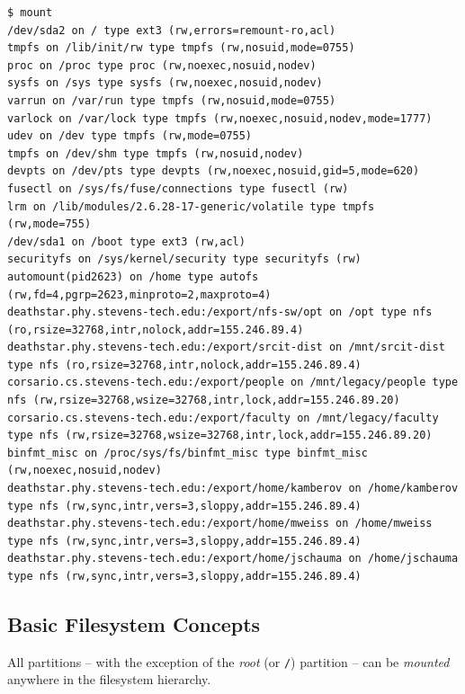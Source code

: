 \documentclass[xga]{xdvislides}
\begin{document}
\small
\begin{verbatim}
$ mount
/dev/sda2 on / type ext3 (rw,errors=remount-ro,acl)
tmpfs on /lib/init/rw type tmpfs (rw,nosuid,mode=0755)
proc on /proc type proc (rw,noexec,nosuid,nodev)
sysfs on /sys type sysfs (rw,noexec,nosuid,nodev)
varrun on /var/run type tmpfs (rw,nosuid,mode=0755)
varlock on /var/lock type tmpfs (rw,noexec,nosuid,nodev,mode=1777)
udev on /dev type tmpfs (rw,mode=0755)
tmpfs on /dev/shm type tmpfs (rw,nosuid,nodev)
devpts on /dev/pts type devpts (rw,noexec,nosuid,gid=5,mode=620)
fusectl on /sys/fs/fuse/connections type fusectl (rw)
lrm on /lib/modules/2.6.28-17-generic/volatile type tmpfs (rw,mode=755)
/dev/sda1 on /boot type ext3 (rw,acl)
securityfs on /sys/kernel/security type securityfs (rw)
automount(pid2623) on /home type autofs (rw,fd=4,pgrp=2623,minproto=2,maxproto=4)
deathstar.phy.stevens-tech.edu:/export/nfs-sw/opt on /opt type nfs (ro,rsize=32768,intr,nolock,addr=155.246.89.4)
deathstar.phy.stevens-tech.edu:/export/srcit-dist on /mnt/srcit-dist type nfs (ro,rsize=32768,intr,nolock,addr=155.246.89.4)
corsario.cs.stevens-tech.edu:/export/people on /mnt/legacy/people type nfs (rw,rsize=32768,wsize=32768,intr,lock,addr=155.246.89.20)
corsario.cs.stevens-tech.edu:/export/faculty on /mnt/legacy/faculty type nfs (rw,rsize=32768,wsize=32768,intr,lock,addr=155.246.89.20)
binfmt_misc on /proc/sys/fs/binfmt_misc type binfmt_misc (rw,noexec,nosuid,nodev)
deathstar.phy.stevens-tech.edu:/export/home/kamberov on /home/kamberov type nfs (rw,sync,intr,vers=3,sloppy,addr=155.246.89.4)
deathstar.phy.stevens-tech.edu:/export/home/mweiss on /home/mweiss type nfs (rw,sync,intr,vers=3,sloppy,addr=155.246.89.4)
deathstar.phy.stevens-tech.edu:/export/home/jschauma on /home/jschauma type nfs (rw,sync,intr,vers=3,sloppy,addr=155.246.89.4)
\end{verbatim}
\Normalsize

\subsection{Basic Filesystem Concepts}
All partitions -- with the exception of the {\em root} (or \verb+/+) partition
-- can be {\em mounted} anywhere in the filesystem hierarchy.
\\
\end{document}
